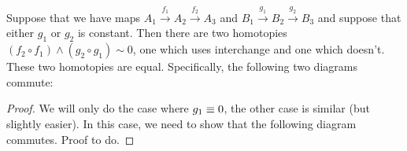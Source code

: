 \documentclass{article}
\newcommand{\lpmap}{\xrightarrow}
\renewcommand{\smash}{\wedge}
\renewcommand{\o}{\ensuremath{\circ}}
\begin{document}
\begin{lem}\label{lem:smash-coh}
  Suppose that we have maps $A_1\lpmap{f_1}A_2\lpmap{f_2}A_3$ and $B_1\lpmap{g_1}B_2\lpmap{g_2}B_3$
  and suppose that either $g_1$ or $g_2$ is constant. Then there are two homotopies
  $(f_2 \o f_1)\smash (g_2 \o g_1)\sim 0$, one which uses interchange and one which doesn't. These two
  homotopies are equal. Specifically, the following two diagrams commute: %
\begin{center}
\qquad
{}
\end{center}

\end{lem}
\begin{proof}
We will only do the case where $g_1\equiv 0$, the other case is similar (but slightly easier). In this case, we need to show that the following diagram commutes.
Proof to do.
\end{proof}
\end{document}

